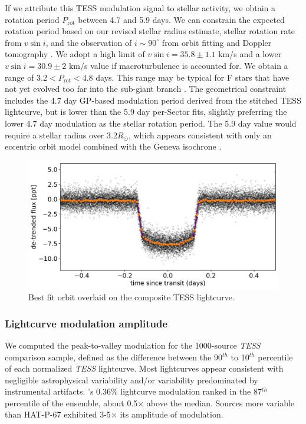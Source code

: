 \documentclass[twocolumn]{aastex631}
\begin{document}
If we attribute this TESS modulation signal to stellar activity, we obtain a rotation period $P_\mathrm{rot}$ between 4.7 and 5.9 days.  We can constrain the expected rotation period based on our revised stellar radius estimate, stellar rotation rate from $v\sin{i}$, and the observation of $i\sim90^\circ$ from orbit fitting and Doppler tomography \citep{2017AJ....153..211Z}.  We adopt a high limit of $v\sin{i}=35.8\pm1.1$ km/s and a lower $v\sin{i}=30.9\pm2$ km/s value if macroturbulence is accounted for.  We obtain a range of $3.2 < P_\mathrm{rot}  < 4.8 $ days.  This range may be typical for F stars that have not yet evolved too far into the sub-giant branch \citep{2022ApJ...930....7A}.  The geometrical constraint includes the 4.7 day GP-based modulation period derived from the stitched TESS lightcurve, but is lower than the 5.9 day per-Sector fits, slightly preferring the lower 4.7 day modulation as the stellar rotation period.  The 5.9 day value would require a stellar radius over 3.2$R_\odot$, which appears consistent with only an eccentric orbit model combined with the Geneva isochrone \citep{2017AJ....153..211Z}.


\begin{figure}
    \includegraphics[width=\linewidth]{figures/best_fit_orbit.png}
    \caption{Best fit orbit overlaid on the composite TESS lightcurve.}
    \label{fig:transit}
\end{figure}

\subsubsection{Lightcurve modulation amplitude}
We computed the peak-to-valley modulation for the 1000-source \emph{TESS} comparison sample, defined as the difference between the 90$^{th}$ to 10$^{th}$ percentile of each normalized \emph{TESS} lightcurve.  Most lightcurves appear consistent with negligible astrophysical variability and/or variability predominated by instrumental artifacts. 's 0.36$\%$ lightcurve modulation ranked in the 87$^{th}$ percentile of the ensemble, about 0.5$\times$ above the median.  Sources more variable than HAT-P-67 exhibited 3-5$\times$ its amplitude of modulation.
\end{document}
